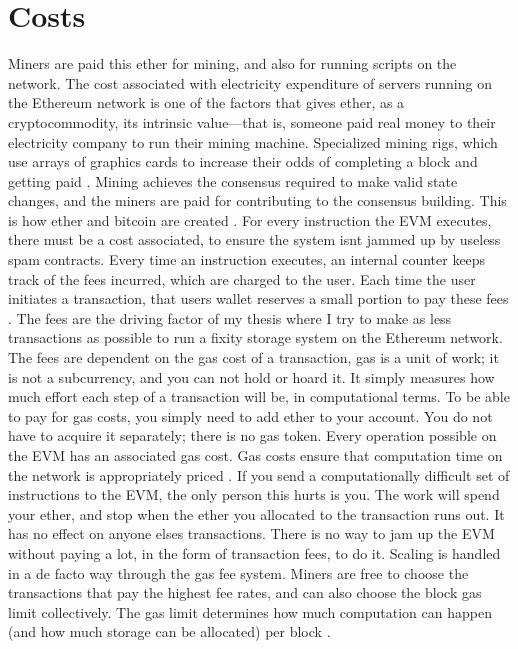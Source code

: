 \section{Costs}
\label{sec:costs}
Miners are paid this ether for mining, and also for running scripts on the network. The cost associated with electricity expenditure of servers running on the Ethereum network is one of the factors that gives ether, as a cryptocommodity, its intrinsic value—that is, someone paid real money to their electricity company to run their mining machine. Specialized mining rigs, which use arrays of graphics cards to increase their odds of completing a block and getting paid \cite[12]{dannen2017introducing}. 
Mining achieves the consensus required to make valid state changes, and the miners are paid for contributing to the consensus building. This is how ether and bitcoin are created  \cite[57]{dannen2017introducing}. 
For every instruction the EVM executes, there must be a cost associated, to ensure the system isnt jammed up by useless spam contracts. Every time an instruction executes, an internal counter keeps track of the fees incurred, which are charged to the user. Each time the user initiates a transaction, that users wallet reserves a small portion to pay these fees \cite[58]{dannen2017introducing}. The fees are the driving factor of my thesis where I try to make as less transactions as possible to run a fixity storage system on the Ethereum network. 
The fees are dependent on the gas cost of a transaction, gas is a unit of work; it is not a subcurrency, and you can not hold or hoard it. It simply measures how much effort each step of a transaction will be, in computational terms. To be able to pay for gas costs, you simply need to add ether to your account. You do not have to acquire it separately; there is no gas token. Every operation possible on the EVM has an associated gas cost. Gas costs ensure that computation time on the network is appropriately priced \cite[59]{dannen2017introducing}.
If you send a computationally difficult set of instructions to the EVM, the only person this hurts is you. The work will spend your ether, and stop when the ether you allocated to the transaction runs out. It has no effect on anyone elses transactions. There is no way to jam up the EVM without paying a lot, in the form of transaction fees, to do it. Scaling is handled in a de facto way through the gas fee system. Miners are free to choose the transactions that pay the highest fee rates, and can also choose the block gas limit collectively. The gas limit determines how much computation can happen (and how much storage can be allocated) per block \cite[60]{dannen2017introducing}. 
